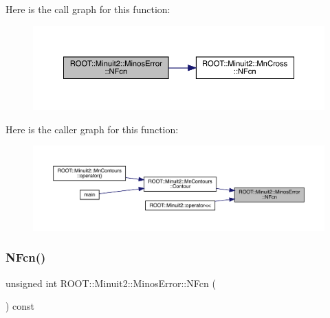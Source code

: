 Here is the call graph for this function\+:
\nopagebreak
\begin{figure}[H]
\begin{center}
\leavevmode
\includegraphics[width=350pt]{d2/dd1/classROOT_1_1Minuit2_1_1MinosError_a4956b01f7899f42847617c378e5c86c2_cgraph}
\end{center}
\end{figure}
Here is the caller graph for this function\+:
\nopagebreak
\begin{figure}[H]
\begin{center}
\leavevmode
\includegraphics[width=350pt]{d2/dd1/classROOT_1_1Minuit2_1_1MinosError_a4956b01f7899f42847617c378e5c86c2_icgraph}
\end{center}
\end{figure}
\mbox{\label{classROOT_1_1Minuit2_1_1MinosError_a4956b01f7899f42847617c378e5c86c2}} 
\subsubsection{\texorpdfstring{NFcn()}{NFcn()}\hspace{0.1cm}{\footnotesize\ttfamily [2/3]}}
{\footnotesize\ttfamily unsigned int R\+O\+O\+T\+::\+Minuit2\+::\+Minos\+Error\+::\+N\+Fcn (\begin{DoxyParamCaption}{ }\end{DoxyParamCaption}) const\hspace{0.3cm}{\ttfamily [inline]}}

